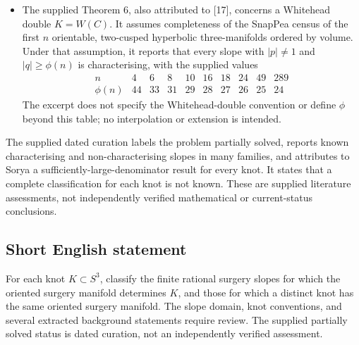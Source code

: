 \documentclass[11pt]{article}
\begin{document}
\begin{itemize}
\item The supplied Theorem 6, also attributed to [17], concerns a Whitehead double \(K=W(C)\). It assumes completeness of the SnapPea census of the first \(n\) orientable, two-cusped hyperbolic three-manifolds ordered by volume. Under that assumption, it reports that every slope with \(|p|\ne1\) and \(|q|\ge\phi(n)\) is characterising, with the supplied values
\[
\begin{array}{c|rrrrrrrrr}
n&4&6&8&10&16&18&24&49&289\\
\hline
\phi(n)&44&33&31&29&28&27&26&25&24
\end{array}
\]
The excerpt does not specify the Whitehead-double convention or define \(\phi\) beyond this table; no interpolation or extension is intended.
\end{itemize}
The supplied dated curation labels the problem partially solved, reports known characterising and non-characterising slopes in many families, and attributes to Sorya a sufficiently-large-denominator result for every knot. It states that a complete classification for each knot is not known. These are supplied literature assessments, not independently verified mathematical or current-status conclusions.
\subsection{Short English statement}
For each knot \(K\subset S^3\), classify the finite rational surgery slopes for which the oriented surgery manifold determines \(K\), and those for which a distinct knot has the same oriented surgery manifold. The slope domain, knot conventions, and several extracted background statements require review. The supplied partially solved status is dated curation, not an independently verified assessment.
\end{document}
